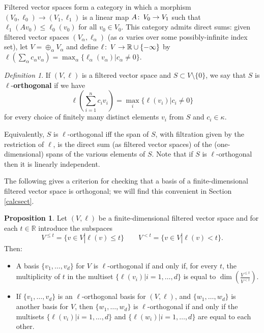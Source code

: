 \documentclass[11pt]{amsart}
\theoremstyle{definition}
\newtheorem{prop}[theorem]{Proposition}
\theoremstyle{remark}
\newtheorem{dfn}[theorem]{Definition}
\numberwithin{equation}{section}
\def\co{\colon\thinspace}
\def\R{\mathbb{R}}
\begin{document}
Filtered vector spaces form a category in which a morphism $(V_0,\ell_0)\to (V_1,\ell_1)$ is a linear map $A\co V_0\to V_1$ such that $\ell_1(Av_0)\leq \ell_0(v_0)$ for all $v_0\in V_0$.  This category admits direct sums: given filtered vector spaces $(V_{\alpha},\ell_{\alpha})$ (as $\alpha$ varies over some possibly-infinite index set), let $V=\oplus_{\alpha}V_{\alpha}$ and define $\ell\co V\to\R\cup\{-\infty\}$ by $\ell\left(\sum_{\alpha}c_{\alpha}v_{\alpha}\right)=\max_{\alpha}\{\ell_{\alpha}(v_{\alpha})|c_{\alpha}\neq 0\}$.

\begin{dfn} If $(V,\ell)$ is a filtered vector space and $S\subset V\setminus\{0\}$, we say that $S$ is $\ell$-\textbf{orthogonal} if we have \begin{equation}\label{orthc}\ell(\sum_{i=1}^{n}c_i v_i)=\max_i\{\ell(v_i)|c_i\neq 0\}\end{equation} for every choice of finitely many distinct elements $v_i$ from $S$ and $c_i\in \kappa$.\end{dfn}  
Equivalently, $S$ is $\ell$-orthogonal iff the span of $S$, with filtration given by the restriction of $\ell$, is the direct sum (as filtered vector spaces) of the (one-dimensional) spans of the various elements of $S$.  Note that if $S$ is $\ell$-orthogonal then it is linearly independent.

The following gives a criterion for checking that a basis of a finite-dimensional filtered vector space is orthogonal; we will find this convenient in Section \ref{calcsect}.

\begin{prop}\label{orthcrit} Let $(V,\ell)$ be a finite-dimensional filtered vector space and for each $t\in \R$ introduce the subspaces \[ V^{\leq t}=\{v\in V|\ell(v)\leq t\} \qquad V^{<t}=\{v\in V|\ell(v)<t\}.\]  Then:
	\begin{itemize}\item[(i)] A basis $\{v_1,\ldots,v_d\}$ for $V$ is $\ell$-orthogonal if and only if, for every $t$, the multiplicity of $t$ in the multiset $\{\ell(v_i)|i=1,\ldots,d\}$ is equal to $\dim\left(\frac{V^{\leq t}}{V^{<t}}\right)$.
		\item[(ii)]  If $\{v_1,\ldots,v_d\}$ is an $\ell$-orthogonal basis for $(V,\ell)$, and $\{w_1,\ldots,w_d\}$ is another basis for $V$, then $\{w_1,\ldots,w_d\}$ is $\ell$-orthogonal if and only if the multisets $\{\ell(v_i)|i=1,\ldots,d\}$ and $\{\ell(w_i)|i=1,\ldots,d\}$ are equal to each other. \end{itemize}
	\end{prop}
\end{document}

